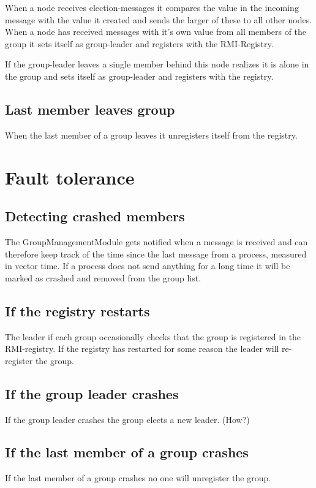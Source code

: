 \documentclass[11pt,swedish]{article}
\begin{document}
When a node receives election-messages it compares the value in the incoming message with the value it created and sends the larger of these to all other nodes. When a node has received messages with it's own value from all members of the group it sets itself as group-leader and registers with the RMI-Registry.

If the group-leader leaves a single member behind this node realizes it is alone in the group and sets itself as group-leader and registers with the registry.

\subsection{Last member leaves group}
When the last member of a group leaves it unregisters itself from the registry.

\section{Fault tolerance}

\subsection{Detecting crashed members}
The GroupManagementModule gets notified when a message is received and can therefore keep track of the time since the last message from a process, measured in vector time. If a process does not send anything for a long time it will be marked as crashed and removed from the group list.

\subsection{If the registry restarts}
The leader if each group occasionally checks that the group is registered in the RMI-registry. If the registry has restarted for some reason the leader will re-register the group.

\subsection{If the group leader crashes}
If the group leader crashes the group elects a new leader. (How?)

\subsection{If the last member of a group crashes}
If the last member of a group crashes no one will unregister the group. 
\end{document}
